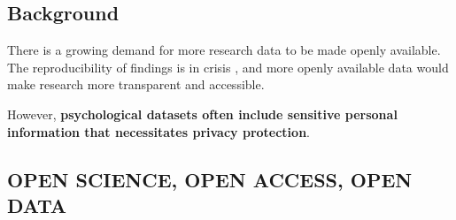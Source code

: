 \documentclass[a0,portrait]{a0poster}
\begin{document}
\vspace{1cm}

\begin{multicols}{3} %

\normalsize
\section{Background}

There is a growing demand for more research data to be made openly available.
The reproducibility of findings is in crisis \cite{2015_OSC}, and more openly available data would make research more transparent and accessible.

However, \textbf{psychological datasets often include sensitive %
personal information that necessitates privacy protection}.

\subsection{OPEN SCIENCE, OPEN ACCESS, OPEN DATA}


\end{multicols}
\end{document}

